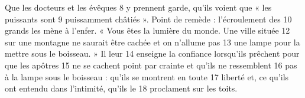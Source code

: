 Que les docteurs et les évêques	 
8	 	y prennent garde, qu'ils voient que « les puissants sont	 
9	 	puissamment châtiés ». Point de remède : l'écroulement des	 
10	 	grands les mène à l'enfer.
« Vous êtes la lumière du monde. Une ville située	 
12	 	sur une montagne ne saurait être cachée et on n'allume pas	 
13	 	une lampe pour la mettre sous le boisseau. » Il leur	 
14	 	enseigne la confiance lorsqu'ils prêchent pour que les apôtres	 
15	 	ne se cachent point par crainte et qu'ils ne ressemblent	 
16	 	pas à la lampe sous le boisseau : qu'ils se montrent en toute	 
17	 	liberté et, ce qu'ils ont entendu dans l'intimité, qu'ils le	 
18	 	proclament sur les toits.